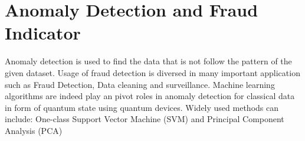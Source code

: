 \section{Anomaly Detection and Fraud Indicator} \label{Sec: Anomaly Detection and Fraud Indicator}

Anomaly detection is used to find the data that is not follow the pattern of the given dataset.
Usage of fraud detection is diversed in many important application such as Fraud Detection, Data cleaning and surveillance.
Machine learning algorithms are indeed play an pivot roles in anomaly detection for classical data in form of quantum state using quantum devices.
Widely used methods can include: One-class Support Vector Machine (SVM) \cite{kyriienkoUnsupervisedQuantumMachine2022} and Principal Component Analysis (PCA) \cite{lloydQuantumPrincipalComponent2014, liuQuantumMachineLearning2018}